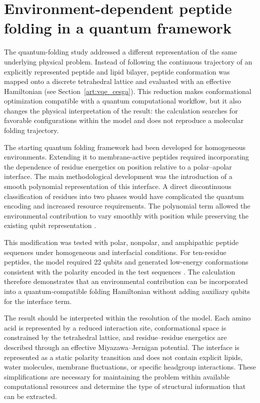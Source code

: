 \section{Environment-dependent peptide folding in a quantum framework}

The quantum-folding study addressed a different representation of the same underlying physical problem. Instead of following the continuous trajectory of an explicitly represented peptide and lipid bilayer, peptide conformation was mapped onto a discrete tetrahedral lattice and evaluated with an effective Hamiltonian \cite{DANI_CUANTICA} (see Section~\ref{art:vqe_cesga}). This reduction makes conformational optimization compatible with a quantum computational workflow, but it also changes the physical interpretation of the result: the calculation searches for favorable configurations within the model and does not reproduce a molecular folding trajectory.

The starting quantum folding framework had been developed for homogeneous environments. Extending it to membrane-active peptides required incorporating the dependence of residue energetics on position relative to a polar--apolar interface. The main methodological development was the introduction of a smooth polynomial representation of this interface. A direct discontinuous classification of residues into two phases would have complicated the quantum encoding and increased resource requirements. The polynomial term allowed the environmental contribution to vary smoothly with position while preserving the existing qubit representation \cite{DANI_CUANTICA}.

This modification was tested with polar, nonpolar, and amphipathic peptide sequences under homogeneous and interfacial conditions. For ten-residue peptides, the model required 22 qubits and generated low-energy conformations consistent with the polarity encoded in the test sequences \cite{DANI_CUANTICA}. The calculation therefore demonstrates that an environmental contribution can be incorporated into a quantum-compatible folding Hamiltonian without adding auxiliary qubits for the interface term.

The result should be interpreted within the resolution of the model. Each amino acid is represented by a reduced interaction site, conformational space is constrained by the tetrahedral lattice, and residue--residue energetics are described through an effective Miyazawa--Jernigan potential. The interface is represented as a static polarity transition and does not contain explicit lipids, water molecules, membrane fluctuations, or specific headgroup interactions. These simplifications are necessary for maintaining the problem within available computational resources and determine the type of structural information that can be extracted.


